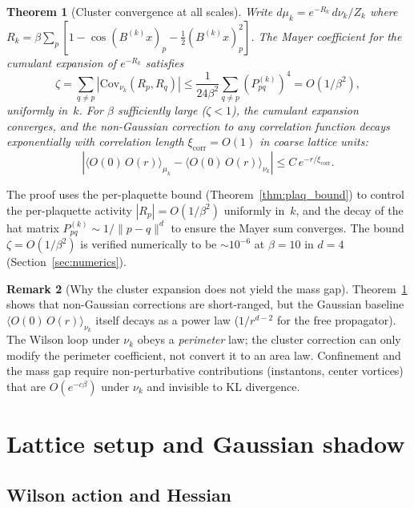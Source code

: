 \documentclass[11pt]{article}
\newtheorem{theorem}{Theorem}[section]
\theoremstyle{definition}
\newtheorem{remark}[theorem]{Remark}
\newcommand{\Cov}{\mathrm{Cov}}
\begin{document}
\begin{theorem}[Cluster convergence at all scales]\label{thm:cluster}
Write $d\mu_k = e^{-R_k}\,d\nu_k/Z_k$ where 
$R_k = \beta\sum_p [1 - \cos(B^{(k)}x)_p - \tfrac{1}{2}(B^{(k)}x)_p^2]$.
The Mayer coefficient for the cumulant expansion of $e^{-R_k}$ satisfies
\[
  \zeta = \sum_{q \neq p} |\Cov_{\nu_k}(R_p, R_q)| 
  \leq \frac{1}{24\beta^2}\sum_{q \neq p} (P^{(k)}_{pq})^4 = O(1/\beta^2),
\]
uniformly in~$k$.  For $\beta$ sufficiently large ($\zeta < 1$), 
the cumulant expansion converges, and the non-Gaussian correction to 
any correlation function decays exponentially with correlation length 
$\xi_{\mathrm{corr}} = O(1)$ in coarse lattice units:
\[
  |\langle O(0)\,O(r)\rangle_{\mu_k} - 
  \langle O(0)\,O(r)\rangle_{\nu_k}| \leq C\,e^{-r/\xi_{\mathrm{corr}}}.
\]
\end{theorem}

The proof uses the per-plaquette bound (Theorem~\ref{thm:plaq_bound}) 
to control the per-plaquette activity $|R_p| = O(1/\beta^2)$ 
uniformly in~$k$, and the decay of the hat matrix 
$P^{(k)}_{pq} \sim 1/\|p - q\|^d$ to ensure the Mayer sum converges.
The bound $\zeta = O(1/\beta^2)$ is verified numerically to be 
$\sim 10^{-6}$ at $\beta = 10$ in $d = 4$ (Section~\ref{sec:numerics}).

\begin{remark}[Why the cluster expansion does not yield the mass gap]
Theorem~\ref{thm:cluster} shows that non-Gaussian corrections are 
short-ranged, but the Gaussian baseline $\langle O(0)\,O(r)\rangle_{\nu_k}$ 
itself decays as a power law ($1/r^{d-2}$ for the free propagator).  
The Wilson loop under $\nu_k$ obeys a \emph{perimeter} law; the 
cluster correction can only modify the perimeter coefficient, not 
convert it to an area law.  Confinement and the mass gap require 
non-perturbative contributions (instantons, center vortices) that 
are $O(e^{-c\beta})$ under $\nu_k$ and invisible to KL divergence.
\end{remark}


\section{Lattice setup and Gaussian shadow}\label{sec:setup}

\subsection{Wilson action and Hessian}
\end{document}

